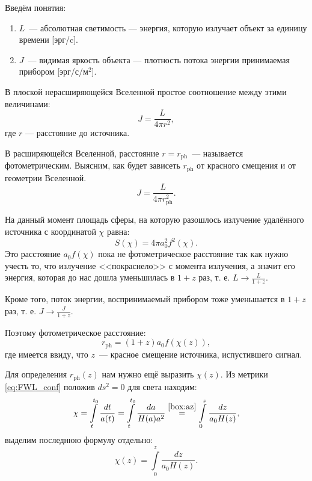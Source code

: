 \documentclass[]{article}
\begin{document}
Введём понятия:
\begin{enumerate}
\item $L$~--- абсолютная светимость --- энергия, которую излучает объект за единицу времени [эрг/c].
\item $J$~--- видимая яркость объекта --- плотность потока энергии принимаемая прибором [эрг/с/м$^2$].
\end{enumerate}
В плоской нерасширяющейся Вселенной простое соотношение между этими величинами:
\begin{equation*}\label{}
    J = \frac{L}{4\pi r^2},
\end{equation*}
где $r$ --- расстояние до источника.

В расширяющейся Вселенной, расстояние $r = r_\text{ph}$~--- называется фотометрическим. Выясним, как будет зависеть $r_\text{ph}$ от красного смещения и от геометрии Вселенной.
\begin{equation*}\label{eq:J}
    J = \frac{L}{4\pi r_\text{ph}^2}.
\end{equation*}

На данный момент площадь сферы, на которую разошлось излучение удалённого источника с координатой $\chi$ равна:
\begin{equation*}\label{}
    S(\chi) = 4\pi a_0^2 f^2(\chi).
\end{equation*}
Это расстояние $a_0 f(\chi)$ пока не фотометрическое расстояние так как нужно учесть то, что излучение <<покраснело>> с момента излучения, а значит его энергия, которая до нас дошла уменьшилась в $1 + z$ раз, т. е. $L \to \frac{L}{1 + z}$.

Кроме того, поток энергии, воспринимаемый прибором тоже уменьшается в $1 + z$ раз, т. е. $J \to \frac{J}{1 + z}$.

Поэтому фотометрическое расстояние:
\begin{equation}\label{eq:ph_dist}
    r_\text{ph} = (1+z) a_0 f(\chi(z)),
\end{equation}
где имеется ввиду, что $z$~--- красное смещение источника, испустившего сигнал.

Для определения $r_\text{ph} (z)$ нам нужно ещё выразить $\chi(z)$. Из метрики \eqref{eq:FWL_conf} положив $ds^2 = 0$ для света находим:
\begin{equation*}\label{}
    \chi = \int\limits_t^{t_0}\frac{dt}{a(t)} = \int\limits_t^{t_0} \frac{da}{H(a)a^2} \stackrel{\ref{box:az}}{=} \int\limits_0^{z} \frac{dz}{a_0 H(z)},
\end{equation*}
выделим последнюю формулу отдельно:
\begin{equation}\label{eq:chi_z}
    \chi(z) = \int\limits_0^{z} \frac{dz}{a_0 H(z)}.
\end{equation}
\end{document}
